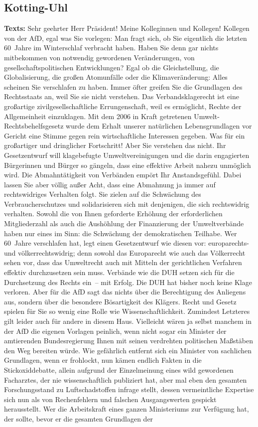 \documentclass{article}
\begin{document}
\subsection{Kotting-Uhl}
\noindent\textbf{Texts:} Sehr geehrter Herr Präsident! Meine Kolleginnen und Kollegen! Kollegen von der AfD, egal was Sie vorlegen: Man fragt sich, ob Sie eigentlich die letzten 60 Jahre im Winterschlaf verbracht haben.  Haben Sie denn gar nichts mitbekommen von notwendig gewordenen Veränderungen, von gesellschaftspolitischen Entwicklungen? Egal ob die Gleichstellung, die Globalisierung, die großen Atomunfälle oder die Klimaveränderung: Alles scheinen Sie verschlafen zu haben. Immer öfter greifen Sie die Grundlagen des Rechtsstaats an, weil Sie sie nicht verstehen.  Das Verbandsklagerecht ist eine großartige zivilgesellschaftliche Errungenschaft, weil es ermöglicht, Rechte der Allgemeinheit einzuklagen. Mit dem 2006 in Kraft getretenen Umwelt-Rechtsbehelfsgesetz wurde dem Erhalt unserer natürlichen Lebensgrundlagen vor Gericht eine Stimme gegen rein wirtschaftliche Interessen gegeben. Was für ein großartiger und dringlicher Fortschritt! Aber Sie verstehen das nicht.  Ihr Gesetzentwurf will klagebefugte Umweltvereinigungen und die darin engagierten Bürgerinnen und Bürger so gängeln, dass eine effektive Arbeit nahezu unmöglich wird. Die Abmahntätigkeit von Verbänden empört Ihr Anstandsgefühl. Dabei lassen Sie aber völlig außer Acht, dass eine Abmahnung ja immer auf rechtswidriges Verhalten folgt. Sie zielen auf die Schwächung des Verbraucherschutzes und solidarisieren sich mit denjenigen, die sich rechtswidrig verhalten.  Sowohl die von Ihnen geforderte Erhöhung der erforderlichen Mitgliederzahl als auch die Aushöhlung der Finanzierung der Umweltverbände haben nur eines im Sinn: die Schwächung der demokratischen Teilhabe.  Wer 60 Jahre verschlafen hat, legt einen Gesetzentwurf wie diesen vor: europarechts- und völkerrechtswidrig; denn sowohl das Europarecht wie auch das Völkerrecht sehen vor, dass das Umweltrecht auch mit Mitteln der gerichtlichen Verfahren effektiv durchzusetzen sein muss.  Verbände wie die DUH setzen sich für die Durchsetzung des Rechts ein – mit Erfolg. Die DUH hat bisher noch keine Klage verloren. Aber für die AfD sagt das nichts über die Berechtigung des Anliegens aus, sondern über die besondere Bösartigkeit des Klägers. Recht und Gesetz spielen für Sie so wenig eine Rolle wie Wissenschaftlichkeit.  Zumindest Letzteres gilt leider auch für andere in diesem Haus. Vielleicht wären ja selbst manchem in der AfD die eigenen Vorlagen peinlich, wenn nicht sogar ein Minister der amtierenden Bundesregierung Ihnen mit seinen verdrehten politischen Maßstäben den Weg bereiten würde.  Wie gefährlich entfernt sich ein Minister von sachlichen Grundlagen, wenn er frohlockt, nun kämen endlich Fakten in die Stickoxiddebatte, allein aufgrund der Einzelmeinung eines wild gewordenen Facharztes, der nie wissenschaftlich publiziert hat,  aber mal eben den gesamten Forschungsstand zu Luftschadstoffen infrage stellt,  dessen vermeintliche Expertise sich nun als von Rechenfehlern und falschen Ausgangswerten gespickt herausstellt.  Wer die Arbeitskraft eines ganzen Ministeriums zur Verfügung hat, der sollte, bevor er die gesamten Grundlagen der 
\end{document}
